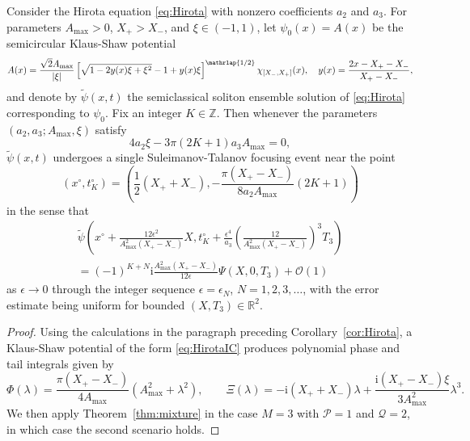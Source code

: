 \documentclass[12pt]{amsart}
\numberwithin{equation}{section}
\newcommand{\ii}{\mathrm{i}}
\newcommand{\SP}{\lambda}
\newcommand{\phaseint}{\Phi}
\newcommand{\tailint}{\Xi}
\newcommand{\eps}{\epsilon}
\newcommand{\bigo}[1]{ \mathcal{O}\! \left( #1 \right) }
\begin{document}
\begin{cor}
Consider the Hirota equation \eqref{eq:Hirota} with nonzero coefficients $a_2$ and $a_3$. For parameters $A_\mathrm{max} >0$, $X_+ > X_-$, and $\xi \in (-1,1)$, let $\psi_0(x)= A(x)$ be the semicircular Klaus-Shaw potential  
\begin{equation}\label{eq:HirotaIC}
	A(x) =  \frac{\sqrt{2} A_\mathrm{max}}{|\xi|} \left[  \sqrt{1 - 2 y(x) \xi + \xi^2} - 1 + y(x) \xi   \right]^{\mathrlap{{1/2}}} \chi_{[X_-, X_+]}(x), 
	\quad y(x)= \frac{2x - X_+ - X_-}{X_+ - X_-}, 
\end{equation}
and denote by $\widetilde \psi(x,t)$ the semiclassical soliton ensemble solution of \eqref{eq:Hirota} corresponding to $\psi_0$. Fix an integer $K\in\mathbb{Z}$.  Then whenever the parameters 
$(a_2,a_3; A_\mathrm{max}, \xi)$ 
satisfy
\begin{equation}\label{eq:Hirota.focus.condition}
	4 a_2 \xi - 3\pi (2K+1) a_3 A_\mathrm{max} = 0,  
\end{equation}
$\widetilde \psi(x,t)$ undergoes a single Suleimanov-Talanov focusing event near the point 
\begin{equation}
(x^\circ, t^\circ_K)=\left(\frac{1}{2}(X_++X_-), -\frac{\pi(X_+-X_-)}{8 a_2 A_\mathrm{max}}(2K+1)\right)
\end{equation}
in the sense that
\begin{multline}
\widetilde{\psi}\left(x^\circ + \frac{12\eps^2}{A_\mathrm{max}^2(X_+-X_-)}X,t^\circ_K+ \frac{\eps^4}{a_3}\left(\frac{12}{ A_\mathrm{max}^2(X_+-X_-)} \right)^3 T_3\right)\\
=(-1)^{K+N} \ii  \frac{A_\mathrm{max}^2(X_+-X_-)}{12\eps}\Psi(X,0,T_3) + \bigo{1}
\label{eq:cor.Hirota.coords}
\end{multline}
as $\eps\to 0$ through the integer sequence $\eps=\eps_N$, $N=1,2,3,\dots$, with the error estimate being uniform for bounded $(X,T_3)\in\mathbb{R}^2$.
\label{cor:Hirota}
\end{cor}



\begin{proof}
Using the calculations in the paragraph preceding Corollary~\ref{cor:Hirota}, a Klaus-Shaw potential of the form \eqref{eq:HirotaIC} produces polynomial phase and tail integrals given by
\begin{equation}\label{eq:Hirota_phase_and_tail}
	\phaseint(\SP) = \frac{\pi(X_+ - X_-)}{4 A_\mathrm{max}} ( A_\mathrm{max}^2+ \SP^2),
	\qquad
	\tailint(\SP) = - \ii (X_+ + X_-) \SP + \frac{\ii (X_+ - X_-) \xi}{3 A_\mathrm{max}^2} \SP^3.
\end{equation}
We then apply Theorem~\ref{thm:mixture} in the case $M=3$ with $\mathcal{P}=1$ and $\mathcal{Q}=2$, in which case the second scenario holds.  
\end{proof}
\end{document}
